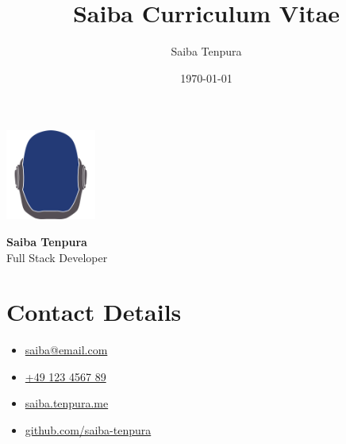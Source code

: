 \documentclass[9pt]{saiba-cv}
\title{Saiba Curriculum Vitae}
\author{Saiba Tenpura}
\date{\today}
\begin{document}

\colorbox{zinc-900}{%
  \begin{minipage}[c][\textheight][t]{0.225\textwidth}
    \color{white}
    \vspace{0.5cm}
    \centering\includegraphics[height=8em]{logo.png}
    \vspace{0.5cm}

    {\Large \textbf{Saiba Tenpura}} \\
    {\large Full Stack Developer}

    \section*{Contact Details}
    \begin{itemize}[leftmargin=1em]
      \item[] \href{mailto:saiba@email.com}{saiba@email.com}
      \item[] \href{tel:49123456789}{+49 123 4567 89 }
      \item[] \href{https://saiba.tenpura.me}{saiba.tenpura.me}
      \item[] \href{https://github.com/saiba-tenpura}{github.com/saiba-tenpura}
    \end{itemize}
  \end{minipage}
}%
\end{document}
